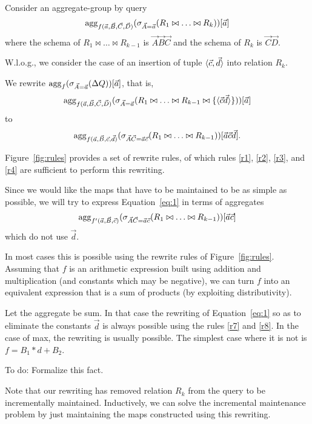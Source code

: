 Consider an aggregate-group by query
\[
\mathrm{agg}_{f(\vec{a}, \vec{B}, \vec{C}, \vec{D})}
(\sigma_{\vec{A}=\vec{a}}(R_1 \bowtie \dots \bowtie R_k))[\vec{a}]
\]
where the schema of $R_1 \bowtie \dots \bowtie R_{k-1}$ is
$\vec{A}\vec{B}\vec{C}$ and the schema of
$R_k$ is $\vec{C}\vec{D}$.

W.l.o.g., we consider the case of an insertion of tuple
${\langle\vec{c},\vec{d}\rangle}$ into relation $R_k$.

We rewrite
$
\mathrm{agg}_f(\sigma_{\vec{A}=\vec{a}}(\Delta Q))[\vec{a}]
$, that is,
\[
\mathrm{agg}_{f(\vec{a}, \vec{B}, \vec{C}, \vec{D})}
(\sigma_{\vec{A}=\vec{a}}(R_1 \bowtie \dots \bowtie R_{k-1} \bowtie \{{\langle\vec{c}\vec{d}\rangle}\}))[\vec{a}]
\]
to
\begin{equation}
\mathrm{agg}_{f(\vec{a}, \vec{B}, \vec{c}, \vec{d})}
(\sigma_{\vec{A}\vec{C}=\vec{a}\vec{c}}(R_1 \bowtie \dots \bowtie R_{k-1}))[\vec{a}\vec{c}\vec{d}].
\label{eq:1}
\end{equation}

Figure~\ref{fig:rules} provides a set of rewrite rules, of which rules
\ref{r1}, \ref{r2}, \ref{r3}, and \ref{r4} are sufficient to  perform this
rewriting.

Since we would like the maps that have to be maintained to be as simple as
possible, we will try to express Equation~\ref{eq:1} in terms of 
aggregates
\begin{equation}
\mathrm{agg}_{f'(\vec{a}, \vec{B}, \vec{c})}
(\sigma_{\vec{A}\vec{C}=\vec{a}\vec{c}}(R_1 \bowtie \dots \bowtie R_{k-1}))[\vec{a}\vec{c}]
\label{eq:2}
\end{equation}
which do not use $\vec{d}$.

In most cases
this is possible using the rewrite rules of Figure~\ref{fig:rules}.
Assuming that $f$ is an arithmetic expression built using addition and multiplication (and constants which may be negative), we can turn $f$ into an equivalent
expression that is a sum of products (by exploiting distributivity).

Let the aggregate be sum. In that case the rewriting of Equation~\ref{eq:1}
so as to eliminate the constants $\vec{d}$
is always possible using the rules \ref{r7} and \ref{r8}.
In the case of max, the rewriting is usually possible. The simplest case
where it is not is $f = B_1 * d + B_2$.


\begin{proposition}
To do: Formalize this fact.
\end{proposition}


Note that our rewriting has removed relation $R_k$ from the query to be
incrementally maintained. Inductively, we can solve the incremental maintenance
problem by just maintaining the maps constructed using this rewriting.


